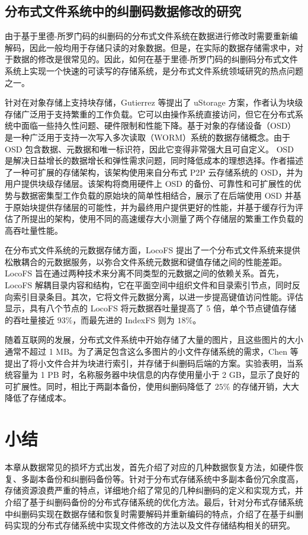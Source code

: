 \subsection{分布式文件系统中的纠删码数据修改的研究}
由于基于里德-所罗门码的纠删码的分布式文件系统在数据进行修改时需要重新编解码，因此一般均用于存储只读的对象数据。但是，在实际的数据存储需求中，对于数据的修改是很常见的。因此，如何在基于里德-所罗门码的纠删码分布式文件系统上实现一个快速的可读写的存储系统，是分布式文件系统领域研究的热点问题之一。

针对在对象存储上支持块存储，Gutierrez 等\cite{gutierrez2017ustorage}提出了 uStorage 方案，作者认为块级存储广泛用于支持繁重的工作负载。它可以由操作系统直接访问，但它在分布式系统中面临一些持久性问题、硬件限制和性能下降。基于对象的存储设备（OSD）是一种广泛用于支持一次写入多次读取（WORM）系统的数据存储概念。由于 OSD 包含数据、元数据和唯一标识符，因此它变得非常强大且可自定义。 OSD 是解决日益增长的数据增长和弹性需求问题，同时降低成本的理想选择。作者描述了一种可扩展的存储架构，该架构使用来自分布式 P2P 云存储系统的 OSD，并为用户提供块级存储层。该架构将商用硬件上 OSD 的备份、可靠性和可扩展性的优势与数据密集型工作负载的原始块的简单性相结合，展示了在后端使用 OSD 并基于原始块提供存储层的可能性，并为最终用户提供更好的性能，并基于缓存行为评估了所提出的架构，使用不同的高速缓存大小测量了两个存储层的繁重工作负载的高吞吐量性能。

在分布式文件系统的元数据存储方面，LocoFS 提出了一个分布式文件系统来提供松散耦合的元数据服务\cite{li2017locofs}，以弥合文件系统元数据和键值存储之间的性能差距。LocoFS 旨在通过两种技术来分离不同类型的元数据之间的依赖关系。首先，LocoFS 解耦目录内容和结构，它在平面空间中组织文件和目录索引节点，同时反向索引目录条目。其次，它将文件元数据分离，以进一步提高键值访问性能。评估显示，具有八个节点的 LocoFS 将元数据吞吐量提高了 5 倍，单个节点键值存储的吞吐量接近 $93\%$，而最先进的 IndexFS 则为 $18\%$。

随着互联网的发展，分布式文件系统中开始存储了大量的图片，且这些图片的大小通常不超过 1 MB。为了满足包含这么多图片的小文件存储系统的需求，Chen 等\cite{chen2017erasure}提出了将小文件合并为块进行索引，并存储于纠删码后端的方案。实验表明，当系统容量为 1 PB 时，名称服务器中块信息的内存使用量小于 2 GB，显示了良好的可扩展性。同时，相比于两副本备份，使用纠删码降低了 $25\%$ 的存储开销，大大降低了存储成本。
\section{小结}
本章从数据常见的损坏方式出发，首先介绍了对应的几种数据恢复方法，如硬件恢复、多副本备份和纠删码备份等。针对于分布式存储系统中多副本备份冗余度高，存储资源浪费严重的特点，详细地介绍了常见的几种纠删码的定义和实现方式，并介绍了基于纠删码备份的分布式存储系统的优化方法。最后，针对分布式存储系统中纠删码实现在数据存储和恢复时需要解码并重新编码的特点，介绍了在基于纠删码实现的分布式存储系统中实现文件修改的方法以及文件存储结构相关的研究。
